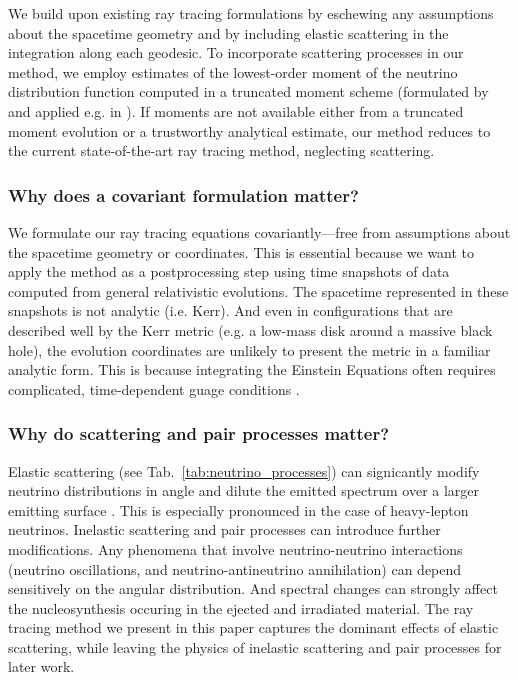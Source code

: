 \documentclass[aps,prd,twocolumn,superscriptaddress]{revtex4-1}
\newcommand{\todo}[1]{\marginpar{\tiny{\textcolor{red}{#1}}}}
\begin{document}
We build upon existing ray tracing formulations
by eschewing any assumptions about the spacetime geometry
and by including elastic scattering in the integration along each
geodesic.
To incorporate scattering processes in our method, we employ estimates of the
lowest-order moment of the neutrino distribution function
computed in a truncated moment scheme (formulated by
\cite{thor1981-truncated_moment, shib2011-truncated_moment}
and applied e.g. in \cite{ramp2002-truncated_moment,
  card2013-truncated_moment, fouc2015-m1_nsbh, ocon2015-gr1d_with_nu}).
If moments are not available either from
a truncated moment evolution or a trustworthy analytical estimate,
our method reduces to the current state-of-the-art ray tracing method,
neglecting scattering.

\subsubsection*{Why does a covariant formulation matter?}
We formulate our ray tracing equations covariantly---free from
assumptions about the spacetime geometry or coordinates. This is essential
because we want to apply the method as a postprocessing step using
time snapshots of data computed from general relativistic evolutions.
The spacetime represented in these snapshots is not analytic (i.e. Kerr).
And even in configurations that are described well by the Kerr metric
(e.g. a low-mass disk around a massive black hole),
the evolution coordinates are unlikely to present the metric in
a familiar analytic form.
This is because integrating the Einstein Equations often requires complicated,
time-dependent guage conditions
\citep{lind2007-gen_harmonic, fouc2013-compactness_and_spin}.

\subsubsection*{Why do scattering and pair processes matter?}
Elastic scattering (see Tab.~\ref{tab:neutrino_processes}) can signicantly
modify neutrino distributions in angle and dilute the emitted spectrum over a
larger emitting surface \citep{pere2016-asl}.
This is especially pronounced in the case of heavy-lepton neutrinos.
\todo{cite}
Inelastic scattering and pair processes can introduce further modifications.
Any phenomena that involve neutrino-neutrino interactions (neutrino oscillations,
and neutrino-antineutrino annihilation) can depend sensitively on the angular
distribution.
And spectral changes can strongly affect the nucleosynthesis
occuring in the ejected and irradiated material.
\todo{justify these statements}
The ray tracing method we present in this paper captures the dominant effects
of elastic scattering, while leaving the physics of inelastic scattering and
pair processes for later work.
\end{document}
